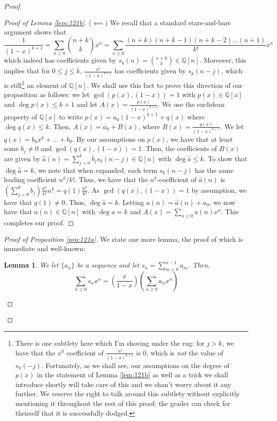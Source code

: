 \documentclass[english]{article}
\newcommand{\QQ}{\mathbb{Q}}
\newenvironment{subproof}[1][\proofname]{%
	\renewcommand{\qedsymbol}{$\blacksquare$}%
	\begin{proof}[#1]%
	}{%
	\end{proof}%
}
\newtheorem{lemma}[theorem]{Lemma}
\theoremstyle{remark}
\theoremstyle{definition}
\begin{document}
\begin{proof}
\begin{subproof}[Proof of Lemma \ref{lem:121b}]
	($\impliedby$) 
We recall that a standard stars-and-bars argument shows that $$\frac{1}{(1-x)^{k+1}}=\sum_{n\geq 0}{n+k\choose k}x^n=\sum_{n\geq 0}\frac{(n+k)(n+k-1)(n+k-2)\hdots(n+1)}{k!}x^n$$ which indeed has coefficients given by $s_k(n)={n+k\choose k}\in \QQ[n]$. Moreover, this implies that for $0\leq j\leq k$, $\frac{x^j}{(1-x)^{k+1}}$ has coefficients given by $s_k(n-j)$, which is still\footnote{There is one subtlety here which I'm shoving under the rug: for $j>k$, we have that the $x^0$ coefficient of $\frac{x^j}{(1-x)^{k+1}}$ is $0$, which is \emph{not} the value of $s_k(-j)$. Fortunately, as we shall see, our assumptions on the degree of $p(x)$ in the statement of Lemma \ref{lem:121b} as well as a trick we shall introduce shortly will take care of this and we shan't worry about it any further. We reserve the right to talk around this subtlety without explicitly mentioning it throughout the rest of this proof; the grader can check for theirself that it is successfully dodged.} an element of $\QQ[n]$. We shall use this fact to prove this direction of our proposition as follows: we let $\gcd(p(x),(1-x))=1$ with $p(x)\in \QQ[x]$ and $\deg p(x)\leq k+1$ and let $A(x)=\frac{p(x)}{(1-x)^{k+1}}$. We use the euclidean property of $\QQ[x]$ to write $p(x)=a_0(1-x)^{k+1}+q(x)$ where $\deg q(x)\leq k$. Then, $A(x)=a_0+B(x)$, where $B(x)=\frac{q(x)}{(1-x)^{k+1}}$. We let $q(x)=b_{k}x^k+\hdots +b_0$. By our assumptions on $p(x)$, we have that at least some $b_j\neq 0$ and $\gcd{(q(x),(1-x))}=1$. Then, the coefficients of $B(x)$ are given by $\hat{a}(n)=\sum_{j=0}^k b_js_k(n-j)\in \QQ[n]$ with $\deg \hat{a}\leq k$. To show that $\deg \hat{a}=k$, we note that when expanded, each term $s_k(n-j)$ has the same leading coefficient $n^k/k!$. Thus, we have that the $n^k$-coefficient of $\hat{a}(n)$ is $\left(\sum_{j=0}^k b_j\right) \frac{n^k}{k!}n^k=q(1)\frac{n^k}{k!}$. As $\gcd(q(x),(1-x))=1$ by assumption, we have that $q(1)\neq 0$. Thus, $\deg \hat{a}=k$. Letting $a(n)=\hat{a}(n)+a_0$, we now have that $a(n)\in \QQ[n]$ with $\deg a=k$ and $A(x)=\sum_{n\geq 0} a(n)x^n$. This completes our proof.
\end{subproof}
\begin{subproof}[Proof of Proposition \ref{pro:121a}]
	We state one more lemma, the proof of which is immediate and well-known:
	\begin{lemma}
		\label{lem:121c} We let $\{a_n\}$ be a sequence and let $s_n=\sum_{m=0}^{n-1}a_m$. Then, $$\sum_{n\geq 0}s_nx^n=\left(\frac{x}{1-x}\right)\left(\sum_{n\geq 0}a_nx^n\right)$$
	\end{lemma}
	

\end{subproof}
\end{proof}
\end{document}
